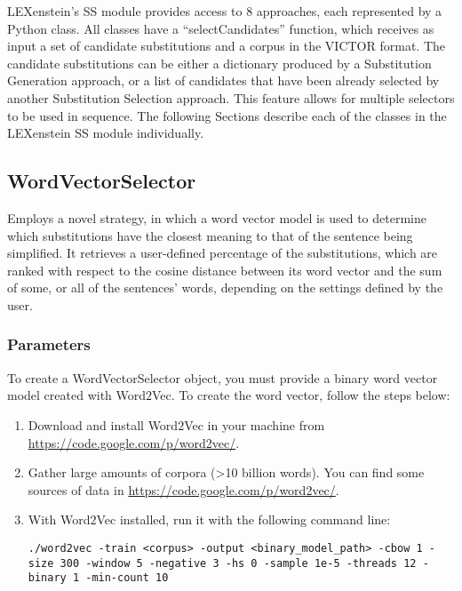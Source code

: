LEXenstein's SS module provides access to $8$ approaches, each represented by a Python class. All classes have a ``selectCandidates'' function, which receives as input a set of candidate substitutions and a corpus in the VICTOR format. The candidate substitutions can be either a dictionary produced by a Substitution Generation approach, or a list of candidates that have been already selected by another Substitution Selection approach. This feature allows for multiple selectors to be used in sequence. The following Sections describe each of the classes in the LEXenstein SS module individually.







\subsection{WordVectorSelector}

Employs a novel strategy, in which a word vector model is used to determine which substitutions have the closest meaning to that of the sentence being simplified. It retrieves a user-defined percentage of the substitutions, which are ranked with respect to the cosine distance between its word vector and the sum of some, or all of the sentences' words, depending on the settings defined by the user.


\subsubsection{Parameters}

To create a WordVectorSelector object, you must provide a binary word vector model created with Word$2$Vec. To create the word vector, follow the steps below:

\begin{enumerate}
\item Download and install Word$2$Vec in your machine from \url{https://code.google.com/p/word2vec/}.
\item Gather large amounts of corpora (>10 billion words). You can find some sources of data in \url{https://code.google.com/p/word2vec/}.
\item With Word$2$Vec installed, run it with the following command line:

\begin{lstlisting}
./word2vec -train <corpus> -output <binary_model_path> -cbow 1 -size 300 -window 5 -negative 3 -hs 0 -sample 1e-5 -threads 12 -binary 1 -min-count 10
\end{lstlisting}
\end{enumerate}

